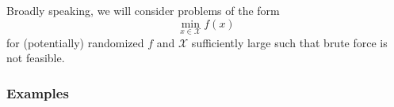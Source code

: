 \newcommand{\N}{\mathbb{N}}
\newcommand{\R}{\mathbb{R}}
\newcommand{\Q}{\mathbb{Q}}
\newcommand{\Z}{\mathbb{Z}}
\newcommand{\C}{\mathbb{C}}

\DeclareMathOperator{\Jac}{Jac}
\DeclareMathOperator{\Ker}{Ker}
\DeclareMathOperator{\mesh}{mesh}
\DeclareMathOperator{\Var}{Var}
\DeclareMathOperator{\hm}{hm}
\DeclareMathOperator{\Tr}{Tr}

\let\temp\phi
\let\phi\varphi
\let\varphi\temp

\newcommand{\pa}[1]{\left(#1\right)}
\newcommand{\bra}[1]{\left[#1\right]}
\newcommand{\cbra}[1]{\left\{#1\right\}}

\newcommand{\mat}[1]{\begin{matrix}#1\end{matrix}}
\newcommand{\pmat}[1]{\pa{\mat{#1}}}
\newcommand{\bmat}[1]{\bra{\mat{#1}}}

\newcommand{\pfrac}[2]{\pa{\frac{#1}{#2}}}
\newcommand{\bfrac}[2]{\bra{\frac{#1}{#2}}}
\newcommand{\psfrac}[2]{\pa{\sfrac{#1}{#2}}}
\newcommand{\bsfrac}[2]{\bra{\sfrac{#1}{#2}}}

Broadly speaking, we will consider problems of the form \[
    \min_{x \in \mathcal X} f(x)
\] for (potentially) randomized \(f\) and \(\mathcal X\) sufficiently
large such that brute force is not feasible.

\subsubsection{Examples}\label{examples}

